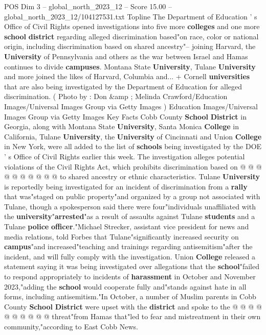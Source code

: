 \begin{textsample}{POS Dim 3 – global\_north\_2023\_12 – Score 15.00 – global\_north\_2023\_12/104127531.txt}  \label{ex:f3_pos_225}
Topline The Department of Education ' s Office of Civil Rights opened investigations into five more \textbf{colleges} and one more \textbf{school} \textbf{district} regarding alleged discrimination based"on race, color or national origin, including discrimination based on shared ancestry"-- joining Harvard, the \textbf{University} of Pennsylvania and others as the war between Israel and Hamas continues to divide \textbf{campuses}.
Montana State \textbf{University}, Tulane \textbf{University} and more joined the likes of Harvard, Columbia and... + Cornell \textbf{universities} that are also being investigated by the Department of Education for alleged discrimination. ( Photo by : Don \&amp ; Melinda Crawford/Education Images/Universal Images Group via Getty Images ) Education Images/Universal Images Group via Getty Images Key Facts Cobb County \textbf{School} \textbf{District} in Georgia, along with Montana State \textbf{University}, Santa Monica \textbf{College} in California, Tulane \textbf{University}, the \textbf{University} of Cincinnati and Union \textbf{College} in New York, were all added to the list of \textbf{schools} being investigated by the DOE ' s Office of Civil Rights earlier this week.
The investigation alleges potential violations of the Civil Rights Act, which prohibits discrimination based on @ @ @ @ @ @ @ @ @ @ to shared ancestry or ethnic characteristics.
Tulane \textbf{University} is reportedly being investigated for an incident of discrimination from a \textbf{rally} that was"staged on public property"and organized by a group not associated with Tulane, though a spokesperson said there were four"individuals unaffiliated with the \textbf{university}"\textbf{arrested}"as a result of assaults against Tulane \textbf{students} and a Tulane \textbf{police} \textbf{officer}."Michael Strecker, assistant vice president for news and media relations, told Forbes that Tulane"significantly increased security on \textbf{campus}"and increased"teaching and trainings regarding antisemitism"after the incident, and will fully comply with the investigation.
Union \textbf{College} released a statement saying it was being investigated over allegations that the \textbf{school}"failed to respond appropriately to incidents of \textbf{harassment} in October and November 2023,"adding the \textbf{school} would cooperate fully and"stands against hate in all forms, including antisemitism."In October, a number of Muslim parents in Cobb County \textbf{School} \textbf{District} were upset with the \textbf{district} and spoke to the @ @ @ @ @ @ @ @ @ @ threat"from Hamas that"led to fear and mistreatment in their own community,"according to East Cobb News.

\end{textsample}

